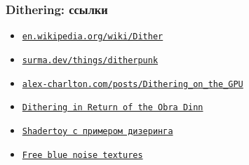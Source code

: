 \documentclass[10pt]{beamer}
\begin{document}
\begin{frame}[fragile]
\frametitle{Dithering: ссылки}
\begin{itemize}
\item \href{https://en.wikipedia.org/wiki/Dither}{\nolinkurl{en.wikipedia.org/wiki/Dither}}
\item \href{https://surma.dev/things/ditherpunk}{\nolinkurl{surma.dev/things/ditherpunk}}
\item \href{http://alex-charlton.com/posts/Dithering_on_the_GPU}{\nolinkurl{alex-charlton.com/posts/Dithering_on_the_GPU}}
\item \href{https://forums.tigsource.com/index.php?topic=40832.msg1363742}{\texttt{Dithering in Return of the Obra Dinn}}
\item \href{https://www.shadertoy.com/view/Dscczs}{\texttt{Shadertoy с примером дизеринга}}
\item \href{https://momentsingraphics.de/BlueNoise.html}{\texttt{Free blue noise textures}}
\end{itemize}
\end{frame}
\end{document}
